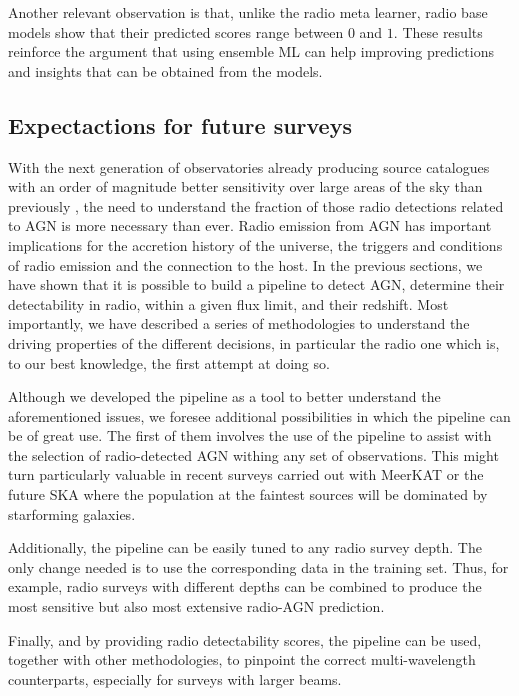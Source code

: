 \documentclass{aa}
\begin{document}
Another relevant observation is that, unlike the radio meta learner, radio base models show that their predicted scores range between $0$ and $1$. These results reinforce the argument that using ensemble ML can help improving predictions and insights that can be obtained from the models.



\subsection{Expectactions for future surveys}\label{sec:future_surveys}

With the next generation of observatories already producing source catalogues with an order of magnitude better sensitivity over large areas of the sky than previously \citep[e.g. RACS, EMU, and MIGHTEE; ][respectively]{2020PASA...37...48M, 2011PASA...28..215N, 2016mks..confE...6J}, the need to understand  the fraction of those radio detections related to AGN is more necessary than ever. Radio emission from AGN has important implications for the accretion history of the universe, the triggers and conditions of radio emission and the connection to the host. In the previous sections, we have shown that it is possible to build a pipeline to detect AGN, determine their detectability in radio, within a given flux limit, and their redshift. Most importantly, we have described a series of methodologies to understand the driving properties of the different decisions, in particular the radio one which is, to our best knowledge, the first attempt at doing so. 

Although we developed the pipeline as a tool to better understand the aforementioned issues, we foresee additional possibilities in which the pipeline can be of great use. The first of them involves the use of the pipeline to assist with the selection of radio-detected AGN withing any set of observations. This might turn particularly valuable in recent surveys carried out with MeerKAT \citep{2016mks..confE...1J} or the future SKA where the population at the faintest sources will be dominated by starforming galaxies.

Additionally, the pipeline can be easily tuned to any radio survey depth. The only change needed is to use the corresponding data in the training set. Thus, for example, radio surveys with different depths can be combined to produce the most sensitive but also most extensive radio-AGN prediction.

Finally, and by providing radio detectability scores, the pipeline can be used, together with other methodologies, to pinpoint the correct multi-wavelength counterparts, especially for surveys with larger beams.
\end{document}
